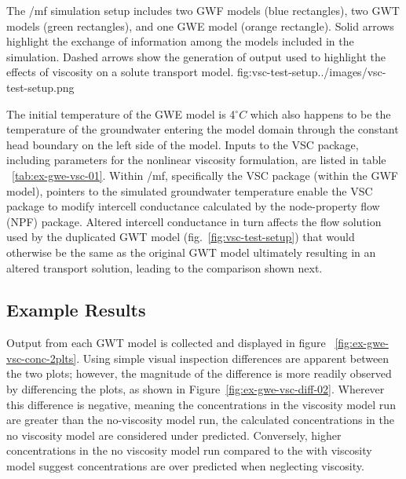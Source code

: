 \begin{StandardFigure}{
    The /mf simulation setup includes two GWF models (blue rectangles), two GWT models (green rectangles), and one GWE model (orange rectangle). Solid arrows highlight the exchange of information among the models included in the simulation.  Dashed arrows show the generation of output used to highlight the effects of viscosity on a solute transport model.}
    {fig:vsc-test-setup}{../images/vsc-test-setup.png}
\end{StandardFigure}

The initial temperature of the GWE model is 4$^{\circ}C$ which also happens to be the temperature of the groundwater entering the model domain through the constant head boundary on the left side of the model.  Inputs to the VSC package, including parameters for the nonlinear viscosity formulation, are listed in table ~\ref{tab:ex-gwe-vsc-01}.  Within /mf, specifically the VSC package (within the GWF model), pointers to the simulated groundwater temperature enable the VSC package to modify intercell conductance calculated by the node-property flow (NPF) package.  Altered intercell conductance in turn affects the flow solution used by the duplicated GWT model (fig.~\ref{fig:vsc-test-setup}) that would otherwise be the same as the original GWT model ultimately resulting in an altered transport solution, leading to the comparison shown next.



\subsection{Example Results}

Output from each GWT model is collected and displayed in figure ~\ref{fig:ex-gwe-vsc-conc-2plts}. Using simple visual inspection differences are apparent between the two plots; however, the magnitude of the difference is more readily observed by differencing the plots, as shown in Figure~\ref{fig:ex-gwe-vsc-diff-02}.  Wherever this difference is negative, meaning the concentrations in the viscosity model run are greater than the no-viscosity model run, the calculated concentrations in the no viscosity model are considered under predicted.  Conversely, higher concentrations in the no viscosity model run compared to the with viscosity model suggest concentrations are over predicted when neglecting viscosity.

